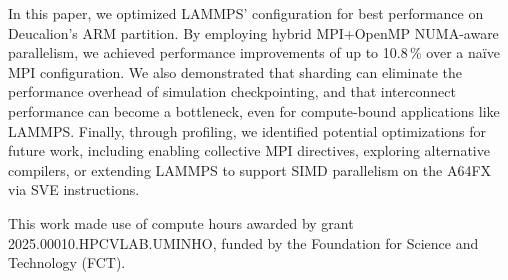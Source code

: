\documentclass[sigplan, nonacm, screen]{acmart}
\begin{document}
In this paper, we optimized LAMMPS' configuration for best performance on Deucalion's ARM partition.
By employing hybrid MPI+OpenMP NUMA-aware parallelism, we achieved performance improvements of up to
10.8\,\% over a naïve MPI configuration. We also demonstrated that sharding can eliminate the
performance overhead of simulation checkpointing, and that interconnect performance can become a
bottleneck, even for compute-bound applications like LAMMPS. Finally, through profiling, we
identified potential optimizations for future work, including enabling collective MPI directives,
exploring alternative compilers, or extending LAMMPS to support SIMD parallelism on the A64FX via
SVE instructions.

\begin{acks} %

    This work made use of compute hours awarded by grant 2025.00010.HPCVLAB.UMINHO, funded by the
    Foundation for Science and Technology (FCT).
\end{acks}




\end{document}
